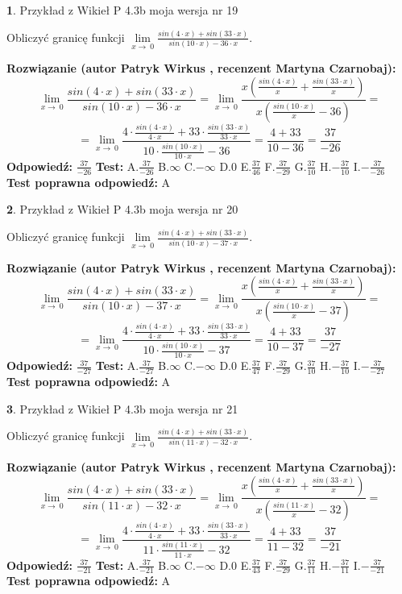 \documentclass[12pt, a4paper]{article}
\theoremstyle{definition} %
\newtheorem{zad}{}
\newcommand{\zadStart}[1]{\begin{zad}#1\newline}
\newcommand{\zadStop}{\end{zad}}
\newcommand{\rozwStart}[2]{\noindent \textbf{Rozwiązanie (autor #1 , recenzent #2): }\newline}
\newcommand{\rozwStop}{\newline}
\newcommand{\odpStart}{\noindent \textbf{Odpowiedź:}\newline}
\newcommand{\odpStop}{\newline}
\newcommand{\testStart}{\noindent \textbf{Test:}\newline}
\newcommand{\testStop}{\newline}
\newcommand{\kluczStart}{\noindent \textbf{Test poprawna odpowiedź:}\newline}
\newcommand{\kluczStop}{\newline}
\begin{document}
\zadStart{Przykład z Wikieł P 4.3b moja wersja nr 19}


Obliczyć granicę funkcji $\lim\limits_{x\to\ 0}\frac{sin(4 \cdot x)+sin(33 \cdot x)}{sin(10 \cdot x)-36 \cdot x}$.
\zadStop
\rozwStart{Patryk Wirkus}{Martyna Czarnobaj}
$$\lim\limits_{x\to\ 0}\frac{sin(4 \cdot x)+sin(33 \cdot x)}{sin(10 \cdot x)-36 \cdot x}=\lim\limits_{x\to\ 0}\frac{x(\frac{sin(4 \cdot x)}{x}+\frac{sin(33 \cdot x)}{x})}{x(\frac{sin(10 \cdot x)}{x}-36)}=$$
$$=\lim\limits_{x\to\ 0}\frac{4 \cdot \frac{sin(4 \cdot x)}{4 \cdot x}+33 \cdot \frac{sin(33 \cdot x)}{33 \cdot x}}{10 \cdot \frac{sin(10 \cdot x)}{10 \cdot x}-36}=\frac{4+33}{10-36} = \frac{37}{-26}$$
\rozwStop
\odpStart
$\frac{37}{-26}$
\odpStop
\testStart
A.$\frac{37}{-26}$
B.$\infty$
C.$-\infty$
D.$0$
E.$\frac{37}{46}$
F.$\frac{37}{-29}$
G.$\frac{37}{10}$
H.$-\frac{37}{10}$
I.$-\frac{37}{-26}$
\testStop
\kluczStart
A
\kluczStop



\zadStart{Przykład z Wikieł P 4.3b moja wersja nr 20}


Obliczyć granicę funkcji $\lim\limits_{x\to\ 0}\frac{sin(4 \cdot x)+sin(33 \cdot x)}{sin(10 \cdot x)-37 \cdot x}$.
\zadStop
\rozwStart{Patryk Wirkus}{Martyna Czarnobaj}
$$\lim\limits_{x\to\ 0}\frac{sin(4 \cdot x)+sin(33 \cdot x)}{sin(10 \cdot x)-37 \cdot x}=\lim\limits_{x\to\ 0}\frac{x(\frac{sin(4 \cdot x)}{x}+\frac{sin(33 \cdot x)}{x})}{x(\frac{sin(10 \cdot x)}{x}-37)}=$$
$$=\lim\limits_{x\to\ 0}\frac{4 \cdot \frac{sin(4 \cdot x)}{4 \cdot x}+33 \cdot \frac{sin(33 \cdot x)}{33 \cdot x}}{10 \cdot \frac{sin(10 \cdot x)}{10 \cdot x}-37}=\frac{4+33}{10-37} = \frac{37}{-27}$$
\rozwStop
\odpStart
$\frac{37}{-27}$
\odpStop
\testStart
A.$\frac{37}{-27}$
B.$\infty$
C.$-\infty$
D.$0$
E.$\frac{37}{47}$
F.$\frac{37}{-29}$
G.$\frac{37}{10}$
H.$-\frac{37}{10}$
I.$-\frac{37}{-27}$
\testStop
\kluczStart
A
\kluczStop



\zadStart{Przykład z Wikieł P 4.3b moja wersja nr 21}


Obliczyć granicę funkcji $\lim\limits_{x\to\ 0}\frac{sin(4 \cdot x)+sin(33 \cdot x)}{sin(11 \cdot x)-32 \cdot x}$.
\zadStop
\rozwStart{Patryk Wirkus}{Martyna Czarnobaj}
$$\lim\limits_{x\to\ 0}\frac{sin(4 \cdot x)+sin(33 \cdot x)}{sin(11 \cdot x)-32 \cdot x}=\lim\limits_{x\to\ 0}\frac{x(\frac{sin(4 \cdot x)}{x}+\frac{sin(33 \cdot x)}{x})}{x(\frac{sin(11 \cdot x)}{x}-32)}=$$
$$=\lim\limits_{x\to\ 0}\frac{4 \cdot \frac{sin(4 \cdot x)}{4 \cdot x}+33 \cdot \frac{sin(33 \cdot x)}{33 \cdot x}}{11 \cdot \frac{sin(11 \cdot x)}{11 \cdot x}-32}=\frac{4+33}{11-32} = \frac{37}{-21}$$
\rozwStop
\odpStart
$\frac{37}{-21}$
\odpStop
\testStart
A.$\frac{37}{-21}$
B.$\infty$
C.$-\infty$
D.$0$
E.$\frac{37}{43}$
F.$\frac{37}{-29}$
G.$\frac{37}{11}$
H.$-\frac{37}{11}$
I.$-\frac{37}{-21}$
\testStop
\kluczStart
A
\kluczStop
\end{document}
